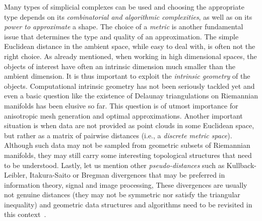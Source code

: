  Many types of simplicial complexes can be used and choosing the appropriate type depends on its {\em combinatorial and algorithmic complexities}, as well as on its {\em power to approximate} a shape.
 The choice of a {\em metric} is another  fundamental issue 
that determines the type and quality of an approximation.
 The simple Euclidean distance in the ambient space, while easy to deal with, is often not the right choice.  As already mentioned, when working in high dimensional spaces, the objects of interest have often an intrinsic dimension much smaller than the ambient dimension. It is thus important to exploit the {\em intrinsic geometry} of the objects. Computational intrinsic geometry has not been seriously tackled yet and even a basic question like the existence of  Delaunay triangulations on Riemannian manifolds has been elusive so far.  This question is of utmost importance for anisotropic mesh generation and optimal approximations. Another important situation is when data are not provided as  point clouds in some Euclidean space, but rather as a matrix of pairwise distances (i.e., a {\em discrete metric space}). Although such data may not be sampled from geometric subsets of Riemannian manifolds, they may still carry some interesting topological structures that need to be understood. 
Lastly, let us mention other {\em pseudo-distances} such as Kullback-Leibler, Itakura-Saito or Bregman divergences that may be preferred in information theory, signal and image processing,
 These divergences are usually not genuine distances (they may not be symmetric nor satisfy the triangular inequality) and  geometric data structures and algorithms need to be revisited in this context~\cite{geometrica-6154a}.




